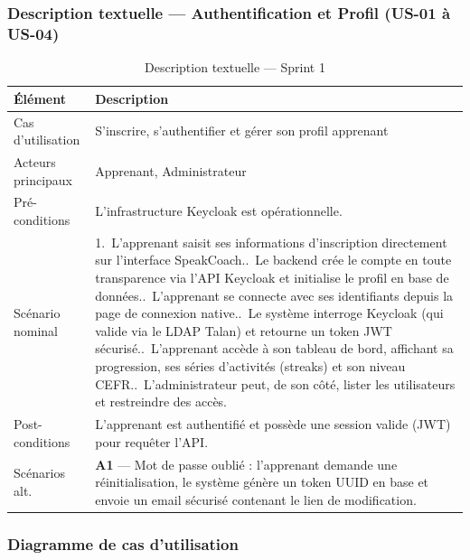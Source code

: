 \subsubsection{Description textuelle --- Authentification et Profil (US-01 à US-04)}

\begin{table}[H]
\centering
\small
\renewcommand{\arraystretch}{1.3}
\begin{tabular}{|l|p{10cm}|}
\hline
\rowcolor[gray]{0.88}
\textbf{Élément} & \textbf{Description} \\
\hline
Cas d'utilisation & S'inscrire, s'authentifier et gérer son profil apprenant \\
\hline
Acteurs principaux  & Apprenant, Administrateur \\
\hline
Pré-conditions    & L'infrastructure Keycloak est opérationnelle. \\
\hline
Scénario nominal  &
    1.~L'apprenant saisit ses informations d'inscription directement sur l'interface SpeakCoach.\newline
    2.~Le backend crée le compte en toute transparence via l'API Keycloak et initialise le profil en base de données.\newline
    3.~L'apprenant se connecte avec ses identifiants depuis la page de connexion native.\newline
    4.~Le système interroge Keycloak (qui valide via le LDAP Talan) et retourne un token JWT sécurisé.\newline
    5.~L'apprenant accède à son tableau de bord, affichant sa progression, ses séries d'activités (streaks) et son niveau CEFR.\newline
    6.~L'administrateur peut, de son côté, lister les utilisateurs et restreindre des accès. \\
\hline
Post-conditions   & L'apprenant est authentifié et possède une session valide (JWT) pour requêter l'API. \\
\hline
Scénarios alt.    &
    \textbf{A1} --- Mot de passe oublié : l'apprenant demande une réinitialisation, le système génère un token UUID en base et envoie un email sécurisé contenant le lien de modification. \\
\hline
\end{tabular}
\caption{Description textuelle --- Sprint 1}
\label{tab:desc-auth}
\end{table}

\subsubsection{Diagramme de cas d'utilisation}

